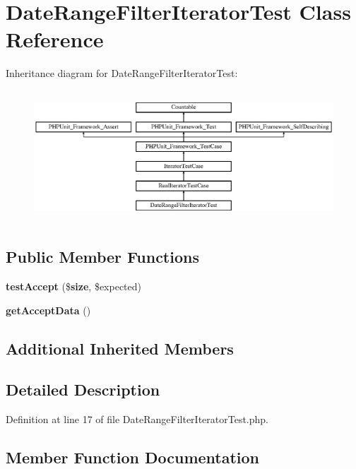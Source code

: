 \section{Date\+Range\+Filter\+Iterator\+Test Class Reference}
\label{class_symfony_1_1_component_1_1_finder_1_1_tests_1_1_iterator_1_1_date_range_filter_iterator_test}
Inheritance diagram for Date\+Range\+Filter\+Iterator\+Test\+:\begin{figure}[H]
\begin{center}
\leavevmode
\includegraphics[height=4.955752cm]{class_symfony_1_1_component_1_1_finder_1_1_tests_1_1_iterator_1_1_date_range_filter_iterator_test}
\end{center}
\end{figure}
\subsection*{Public Member Functions}
\begin{DoxyCompactItemize}
\item 
{\bf test\+Accept} (\${\bf size}, \$expected)
\item 
{\bf get\+Accept\+Data} ()
\end{DoxyCompactItemize}
\subsection*{Additional Inherited Members}


\subsection{Detailed Description}


Definition at line 17 of file Date\+Range\+Filter\+Iterator\+Test.\+php.



\subsection{Member Function Documentation}
